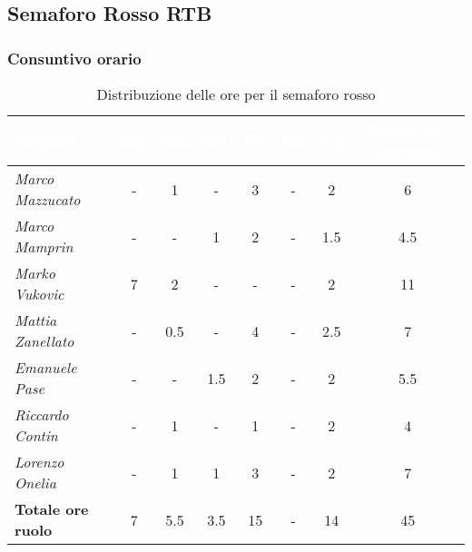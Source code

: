 \subsection{Semaforo Rosso RTB}
\subsubsection{Consuntivo orario}
\begin{table}[H]
    \renewcommand\arraystretch{1.5}
    \small
    \centering
        \begin{tabular}{|l|c|c|c|c|c|c|c|}
            \hline
            \rowcolor[HTML]{036400}
            \textcolor{white}{\textbf{Membro}} & \multicolumn{1}{c|}{\textcolor{white}{\textbf{RE}}} & \multicolumn{1}{c|}{\textcolor{white}{\textbf{AM}}} & \multicolumn{1}{c|}{\textcolor{white}{\textbf{AN}}} & \multicolumn{1}{c|}{\textcolor{white}{\textbf{PT}}} & \multicolumn{1}{c|}{\textcolor{white}{\textbf{PR}}} & \multicolumn{1}{c|}{\textcolor{white}{\textbf{VE}}} & \multicolumn{1}{c|}{\textcolor{white}{\textbf{Totale ore persona}}} \\ \hline
            \rowcolor[HTML]{EFEFEF}\textit{Marco Mazzucato}  & -        & 1          & -          & 3          & -        & 2        & 6       \\ \hline
            \rowcolor[HTML]{C0C0C0}\textit{Marco Mamprin}    & -        & -          & 1          & 2          & -        & 1.5      & 4.5       \\ \hline
            \rowcolor[HTML]{EFEFEF}\textit{Marko Vukovic}    & 7        & 2          & -          & -          & -        & 2        & 11       \\ \hline
            \rowcolor[HTML]{C0C0C0}\textit{Mattia Zanellato} & -        & 0.5        & -          & 4          & -        & 2.5      & 7       \\ \hline
            \rowcolor[HTML]{EFEFEF}\textit{Emanuele Pase}    & -        & -          & 1.5        & 2          & -        & 2        & 5.5       \\ \hline
            \rowcolor[HTML]{C0C0C0}\textit{Riccardo Contin}  & -        & 1          & -          & 1          & -        & 2        & 4       \\ \hline
            \rowcolor[HTML]{EFEFEF}\textit{Lorenzo Onelia}   & -        & 1          & 1          & 3          & -        & 2        & 7       \\ \hline
            \rowcolor[HTML]{C0C0C0}\textbf{Totale ore ruolo} & 7        & 5.5        & 3.5        & 15         & -        & 14       & 45       \\ \hline
        \end{tabular}
    \caption{Distribuzione delle ore per il semaforo rosso}
\end{table}

